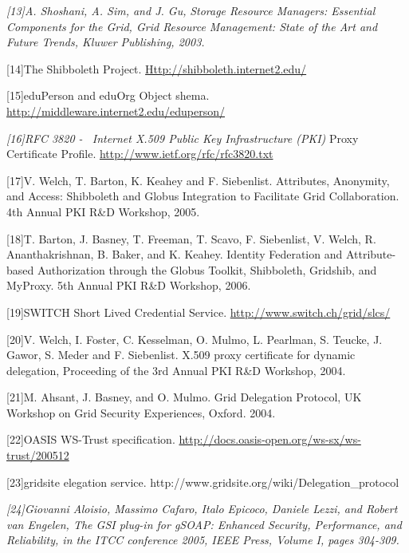 \documentclass{article}
\newcommand\textstyleCitation[1]{\textit{#1}}
\begin{document}
\textstyleCitation{\textup{[13]A. Shoshani, A. Sim, and J. Gu,
}}\textstyleCitation{Storage Resource Managers: Essential Components
for the Grid}\textstyleCitation{\textup{, Grid Resource Management:
State of the Art and Future Trends, Kluwer Publishing, 2003.}}

[14]The Shibboleth Project.
\href{http://shibboleth.internet2.edu/}{Http://shibboleth.internet2.edu/}

[15]eduPerson and eduOrg Object shema.
\url{http://middleware.internet2.edu/eduperson/}

\textstyleCitation{\textup{[16]RFC 3820 - \ Internet X.509 Public Key
Infrastructure (PKI)}} Proxy Certificate Profile.
\url{http://www.ietf.org/rfc/rfc3820.txt}

[17]V. Welch, T. Barton, K. Keahey and F. Siebenlist. Attributes,
Anonymity, and Access: Shibboleth and Globus Integration to Facilitate
Grid Collaboration. 4th Annual PKI R\&D Workshop, 2005. 

[18]T. Barton, J. Basney, T. Freeman, T. Scavo, F. Siebenlist, V. Welch,
R. Ananthakrishnan, B. Baker, and K. Keahey. Identity Federation and
Attribute-based Authorization through the Globus Toolkit, Shibboleth,
Gridshib, and MyProxy. 5th Annual PKI R\&D Workshop, 2006. 

[19]SWITCH Short Lived Credential Service.
\url{http://www.switch.ch/grid/slcs/}

[20]V. Welch, I. Foster, C. Kesselman, O. Mulmo, L. Pearlman, S. Teucke,
J. Gawor, S. Meder and F. Siebenlist. X.509 proxy certificate for
dynamic delegation, Proceeding of the 3rd Annual PKI R\&D Workshop,
2004.

[21]M. Ahsant, J. Basney, and O. Mulmo. Grid Delegation Protocol, UK
Workshop on Grid Security Experiences, Oxford. 2004.

[22]OASIS WS-Trust specification.
\url{http://docs.oasis-open.org/ws-sx/ws-trust/200512}

[23]gridsite elegation service.
http://www.gridsite.org/wiki/Delegation\_protocol

\textstyleCitation{\textup{[24]}}\textstyleCitation{\textup{Giovanni
Aloisio, Massimo Cafaro, Italo Epicoco, Daniele Lezzi, and Robert van
Engelen, The GSI plug-in for gSOAP: Enhanced Security, Performance, and
Reliability, in the ITCC conference 2005, IEEE Press, Volume I, pages
304-309.}}


\bigskip


\bigskip


\bigskip


\bigskip


\bigskip
\end{document}
